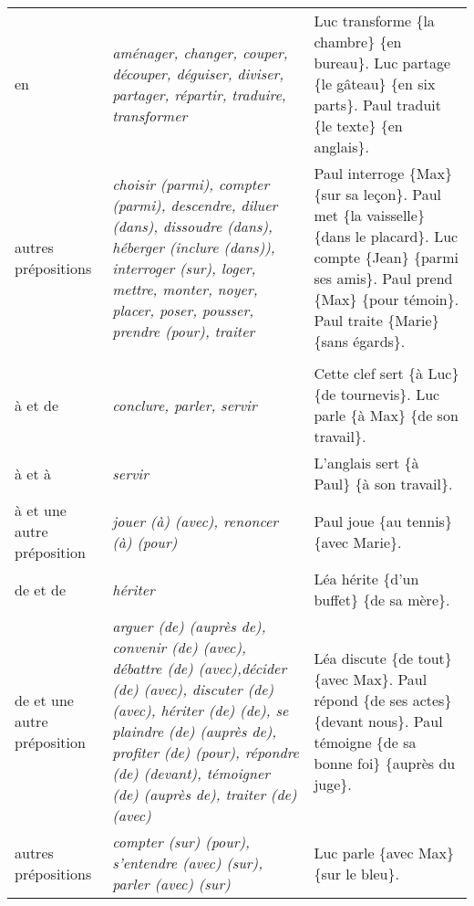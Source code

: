 \documentclass[UTF8]{report}
\begin{document}
\begin{table}[H]
\begin{adjustbox}{max width=\textwidth}
\begin{tabularx}{\textwidth}{|l|>{\itshape}Y|Y|}
        en & aménager, changer, couper, découper, déguiser, diviser, partager, répartir, traduire, transformer & Luc transforme \{la chambre\} \{en bureau\}. \newline Luc partage \{le gâteau\} \{en six parts\}. \newline Paul traduit \{le texte\} \{en anglais\}. \\
        autres prépositions & choisir (parmi), compter (parmi), descendre, diluer (dans), dissoudre (dans), héberger (inclure (dans)), interroger (sur), loger, mettre, monter, noyer, placer, poser, pousser, prendre (pour), \newline traiter & Paul interroge \{Max\} \{sur sa leçon\}. \newline Paul met \{la vaisselle\} \{dans le placard\}. \newline Luc compte \{Jean\} \{parmi ses amis\}. \newline Paul prend \{Max\} \{pour témoin\}. \newline Paul traite \{Marie\} \{sans égards\}. \\
        \hline
         \\
        \hline
        à et de & conclure, parler, servir & Cette clef sert \{à Luc\} \{de tournevis\}. \newline Luc parle \{à Max\} \{de son travail\}. \\
        \hline
        à et à & servir & L'anglais sert \{à Paul\} \{à son travail\}. \\
        \hline
        à et une autre préposition & jouer (à) (avec), renoncer (à) (pour) & Paul joue \{au tennis\} \{avec Marie\}. \\
        \hline
        de et de & hériter & Léa hérite \{d'un buffet\} \{de sa mère\}. \\
        \hline
        de et une autre préposition & arguer (de) (auprès de), convenir (de) (avec), débattre (de) (avec),décider (de) (avec), discuter (de) (avec), hériter (de) (de), se plaindre (de) (auprès de), profiter (de) (pour), répondre (de) (devant), témoigner (de) (auprès de), traiter (de) (avec) & Léa discute \{de tout\} \{avec Max\}. \newline Paul répond \{de ses actes\} \{devant nous\}. \newline Paul témoigne \{de sa bonne foi\} \{auprès du juge\}. \\
        \hline
        autres prépositions & compter (sur) (pour), s'entendre (avec) (sur), parler (avec) (sur) & Luc parle \{avec Max\} \{sur le bleu\}. \\
        \hline
        \end{tabularx}
    \end{adjustbox}
\end{table}
\end{document}
